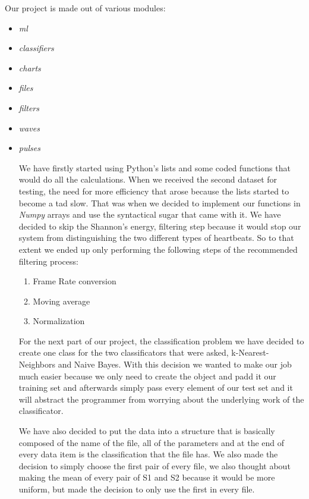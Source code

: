 \documentclass[conference]{IEEEtran}
\begin{document}
Our project is made out of various modules:
\begin{itemize}
	\item \textit{ml}
	\item \textit{classifiers}
	\item \textit{charts}
	\item \textit{files}
	\item \textit{filters}
	\item \textit{waves}
	\item \textit{pulses}
\begin{itemize}

We have firstly started using Python's lists and some coded functions that would
do all the calculations. When we received the second dataset for testing, the
need for more efficiency that arose because the lists started to become a tad
slow. That was when we decided to implement our functions in \textit{Numpy}
arrays and use the syntactical sugar that came with it. We have decided to
skip the Shannon's energy, filtering step because it would stop our system from
distinguishing the two different types of heartbeats. So to that extent we
ended up only performing the following steps of the recommended filtering
process:
\begin{enumerate}
	\item Frame Rate conversion
	\item Moving average
	\item Normalization
\end{enumerate}

For the next part of our project, the classification problem we have decided to
create one class for the two classificators that were asked, k-Nearest-Neighbors
and Naive Bayes. With this decision we wanted to make our job much easier
because we only need to create the object and padd it our training set and
afterwards simply pass every element of our test set and it will abstract the
programmer from worrying about the underlying work of the classificator.

We have also decided to put the data into a structure that is basically composed
of the name of the file, all of the parameters and at the end of every data
item is the classification that the file has. We also made the decision to
simply choose the first pair of every file, we also thought about making the
mean of every pair of S1 and S2 because it would be more uniform, but made the
decision to only use the first in every file.


\end{itemize}
\end{itemize}
\end{document}
